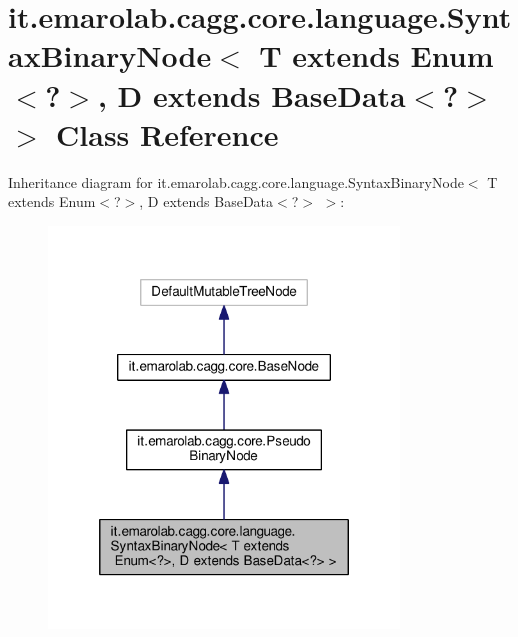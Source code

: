 \hypertarget{classit_1_1emarolab_1_1cagg_1_1core_1_1language_1_1SyntaxBinaryNode_3_01T_01extends_01Enum_3_04_6f6f52bca8b05a51e94968cedaccd1f1}{\section{it.\-emarolab.\-cagg.\-core.\-language.\-Syntax\-Binary\-Node$<$ T extends Enum$<$?$>$, D extends Base\-Data$<$?$>$ $>$ Class Reference}
\label{classit_1_1emarolab_1_1cagg_1_1core_1_1language_1_1SyntaxBinaryNode_3_01T_01extends_01Enum_3_04_6f6f52bca8b05a51e94968cedaccd1f1}
}


Inheritance diagram for it.\-emarolab.\-cagg.\-core.\-language.\-Syntax\-Binary\-Node$<$ T extends Enum$<$?$>$, D extends Base\-Data$<$?$>$ $>$\-:\nopagebreak
\begin{figure}[H]
\begin{center}
\leavevmode
\includegraphics[width=264pt]{classit_1_1emarolab_1_1cagg_1_1core_1_1language_1_1SyntaxBinaryNode_3_01T_01extends_01Enum_3_04_5fcae91012c8ee66720a986cd701e2bc}
\end{center}
\end{figure}


